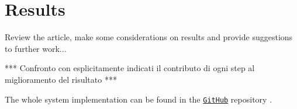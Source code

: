 \section{Results}\label{section:results}
    Review the article, make some considerations on results and provide suggestions to further work...

    *** Confronto con esplicitamente indicati il contributo di ogni step al miglioramento del risultato ***

    The whole system implementation can be found in the \href{https://github.com/antonioterpin/wavelet_ml}{\texttt{GitHub}} repository \cite{antonioterpin:github}.

